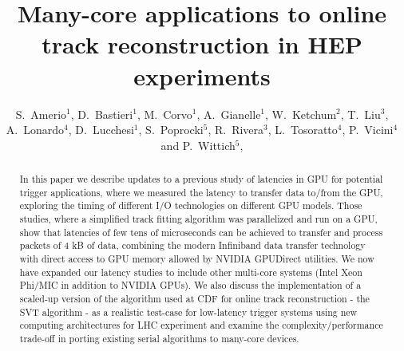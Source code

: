 \documentclass[a4]{jpconf}
\begin{document}
\title{Many-core applications to online track reconstruction in HEP experiments}
\author{S.~Amerio$^1$, 
  D.~Bastieri$^1$, 
  M.~Corvo$^1$, 
  A.~Gianelle$^1$, 
  W.~Ketchum$^2$,
  T.~Liu$^3$, 
  A.~Lonardo$^4$, 
  D.~Lucchesi$^1$,
  S.~Poprocki$^5$, 
  R.~Rivera$^3$, 
  L.~Tosoratto$^4$,
  P.~Vicini$^4$
  and 
  P.~Wittich$^5$,
}
\address{$^1$ INFN and University of Padova, Padova, Italy}
\address{$^2$ Los Alamos National Laboratory, Los Alamos, New Mexico, USA}
\address{$^3$ Fermi National Accelerator Laboratory, Batavia, Illinois, USA}
\address{$^4$ INFN Roma, Rome, Italy}
\address{$^5$ Cornell University, Ithaca, New York, USA}


\begin{abstract}
  In this paper we describe updates to a previous study of latencies
  in GPU for potential trigger applications, where we measured the
  latency to transfer data to/from the GPU, exploring the timing of
  different I/O technologies on different GPU models.  Those studies,
  where a simplified track fitting algorithm was parallelized and run
  on a GPU, show that latencies of few tens of microseconds can be
  achieved to transfer and process packets of 4 kB of data, combining
  the modern Infiniband data transfer technology with direct access to
  GPU memory allowed by NVIDIA GPUDirect utilities.  We now have
  expanded our latency studies to include other multi-core systems
  (Intel Xeon Phi/MIC in addition to NVIDIA GPUs). We also discuss the
  implementation of a scaled-up version of the algorithm used at CDF
  for online track reconstruction - the SVT algorithm - as a realistic
  test-case for low-latency trigger systems using new computing
  architectures for LHC experiment and examine the
  complexity/performance trade-off in porting existing serial
  algorithms to many-core devices.
\end{abstract}
\end{document}
